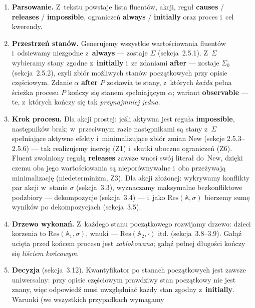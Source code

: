 \documentclass[11pt,a4paper]{article}
\newcommand{\Res}{\mathrm{Res}}
\newcommand{\New}{\mathrm{New}}
\begin{document}
\begin{enumerate}
  \item \textbf{Parsowanie.} Z~tekstu powstaje lista fluentów, akcji, reguł
        \textbf{causes} / \textbf{releases} / \textbf{impossible}, ograniczeń
        \textbf{always} / \textbf{initially} oraz proces i~cel kwerendy.
  \item \textbf{Przestrzeń stanów.} Generujemy wszystkie wartościowania
        fluentów i~odsiewamy niezgodne z~\textbf{always} --- zostaje $\Sigma$
        (sekcja~2.5.1). Z~$\Sigma$ wybieramy stany zgodne z~\textbf{initially}
        i~ze zdaniami \textbf{after} --- zostaje $\Sigma_0$ (sekcja~2.5.2),
        czyli zbiór możliwych stanów początkowych przy opisie częściowym.
        Zdanie $\alpha$ \textbf{after} $P$ zostawia te stany, z~których
        \emph{każda} pełna ścieżka procesu $P$ kończy się stanem spełniającym
        $\alpha$; wariant \textbf{observable} --- te, z~których kończy się tak
        \emph{przynajmniej jedna}.
  \item \textbf{Krok procesu.} Dla akcji prostej: jeśli aktywna jest reguła
        \textbf{impossible}, następników brak; w~przeciwnym razie następnikami
        są stany z~$\Sigma$ spełniające aktywne efekty i~minimalizujące zbiór
        zmian $\New$ (sekcje 2.5.3--2.5.6) --- tak realizujemy inercję (Z1)
        i~skutki uboczne ograniczeń (Z6). Fluent zwolniony regułą
        \textbf{releases} zawsze wnosi swój literał do~$\New$, dzięki czemu oba
        jego wartościowania są nieporównywalne i~oba przeżywają minimalizację
        (niedeterminizm, Z3). Dla akcji złożonej: wykrywamy konflikty par akcji
        w~stanie $\sigma$ (sekcja~3.3), wyznaczamy maksymalne bezkonfliktowe
        podzbiory --- dekompozycje (sekcja~3.4) --- i~jako
        $\Res(\mathbb{A},\sigma)$ bierzemy sumę wyników po dekompozycjach
        (sekcja~3.5).
  \item \textbf{Drzewo wykonań.} Z~każdego stanu początkowego rozwijamy
        drzewo: dzieci korzenia to $\Res(\mathbb{A}_1,\sigma)$, wnuki ---
        $\Res(\mathbb{A}_2,\cdot)$ itd. (sekcja~3.8--3.9). Gałąź ucięta przed
        końcem procesu jest \emph{zablokowana}; gałąź pełnej długości kończy
        się \emph{liściem końcowym}.
  \item \textbf{Decyzja} (sekcja~3.12). Kwantyfikator po stanach początkowych
        jest zawsze uniwersalny: przy opisie częściowym prawdziwy stan początkowy
        nie jest znany, więc odpowiedź musi uwzględniać każdy stan zgodny
        z~\textbf{initially}. Warunki (we wszystkich przypadkach wymagamy

\end{enumerate}
\end{document}
